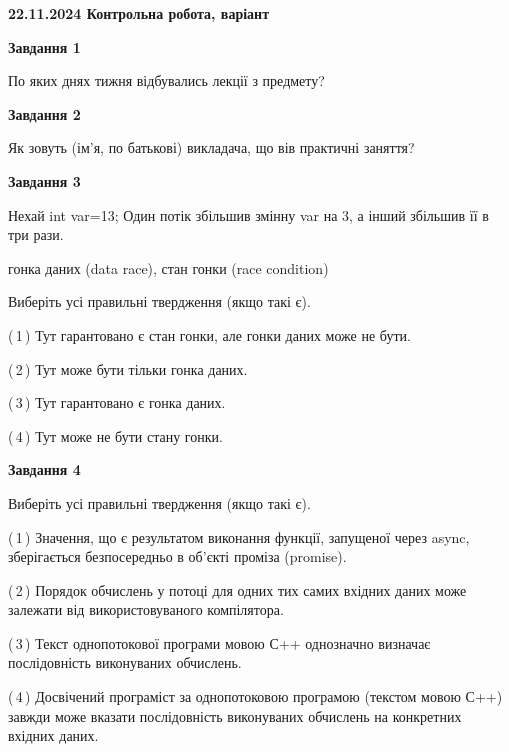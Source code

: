 \documentclass[12pt, ukrainian]{article}
\begin{document}
\begin {large}

\textbf{22.11.2024 Контрольна робота, варіант  }\par


{

\begin{center}
\textbf{Завдання 1}
\end{center}

По яких днях тижня відбувались лекції з предмету?


\begin{center}
\textbf{Завдання 2}
\end{center}

Як зовуть (ім'я, по батькові) викладача, що вів практичні заняття?


\begin{center}
\textbf{Завдання 3}
\end{center}

Нехай int var=13; Один потік збільшив змінну var на 3, а інший збільшив її в три рази.

гонка даних (data race), стан гонки (race condition)

Виберіть усі правильні твердження (якщо такі є).\par
\vspace{2mm}
(\,1\,) Тут гарантовано є стан гонки, але гонки даних може не бути.%

(\,2\,) Тут може бути тільки гонка даних.%

(\,3\,) Тут гарантовано є гонка даних.%

(\,4\,) Тут може не бути стану гонки.%


\begin{center}
\textbf{Завдання 4}
\end{center}

Виберіть усі правильні твердження (якщо такі є).\par
\vspace{2mm}

(\,1\,) Значення, що є результатом виконання функції, запущеної через async, зберігається безпосередньо в об’єкті проміза (promise).%

(\,2\,) Порядок обчислень у потоці для одних тих самих вхідних даних може залежати від використовуваного компілятора.%

(\,3\,) Текст однопотокової програми мовою С++ однозначно визначає послідовність виконуваних обчислень.%

(\,4\,) Досвічений програміст за однопотоковою програмою (текстом мовою С++) завжди може вказати послідовність виконуваних обчислень на конкретних вхідних даних.%


}
\end{large}
\end{document}
